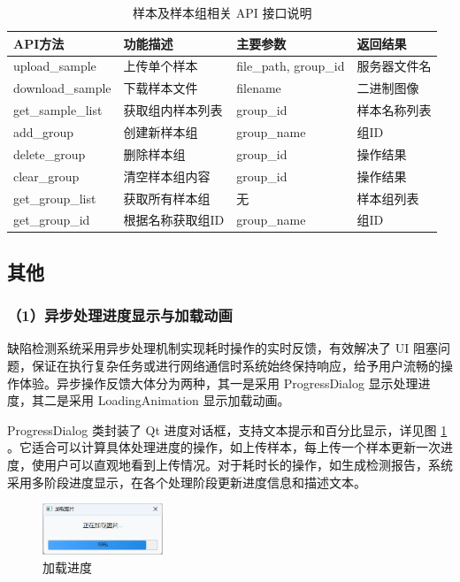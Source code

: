 \documentclass[
  ]{njuthesis}
\begin{document}
\begin{table}[H]
    \centering
    \caption{样本及样本组相关 API 接口说明}
    \label{sample_API}
    \renewcommand\arraystretch{0.8}
    \begin{tabular}{p{2.5cm}p{3.5cm}p{4cm}p{2.5cm}}
    \toprule
    API方法 & 功能描述 & 主要参数 & 返回结果 \\
    \midrule
    upload\_sample & 上传单个样本 & file\_path, group\_id & 服务器文件名 \\
    download\_sample & 下载样本文件 & filename & 二进制图像 \\
    get\_sample\_list & 获取组内样本列表 & group\_id & 样本名称列表 \\
    add\_group & 创建新样本组 & group\_name & 组ID \\
    delete\_group & 删除样本组 & group\_id & 操作结果 \\
    clear\_group & 清空样本组内容 & group\_id & 操作结果 \\
    get\_group\_list & 获取所有样本组 & 无 & 样本组列表 \\
    get\_group\_id & 根据名称获取组ID & group\_name & 组ID \\
    \bottomrule
    \end{tabular}
\end{table}

\subsection{其他}

\subsubsection{（1）异步处理进度显示与加载动画}

缺陷检测系统采用异步处理机制实现耗时操作的实时反馈，有效解决了 UI 阻塞问题，保证在执行复杂任务或进行网络通信时系统始终保持响应，给予用户流畅的操作体验。异步操作反馈大体分为两种，其一是采用 ProgressDialog 显示处理进度，其二是采用 LoadingAnimation 显示加载动画。

ProgressDialog 类封装了 Qt 进度对话框，支持文本提示和百分比显示，详见图 \ref{加载进度} 。它适合可以计算具体处理进度的操作，如上传样本，每上传一个样本更新一次进度，使用户可以直观地看到上传情况。对于耗时长的操作，如生成检测报告，系统采用多阶段进度显示，在各个处理阶段更新进度信息和描述文本。

\begin{figure}[htb]
    \centering
    \includegraphics[width=0.32\textwidth]{images/加载进度.png}
    \caption{加载进度}
    \label{加载进度}
\end{figure}
\end{document}
